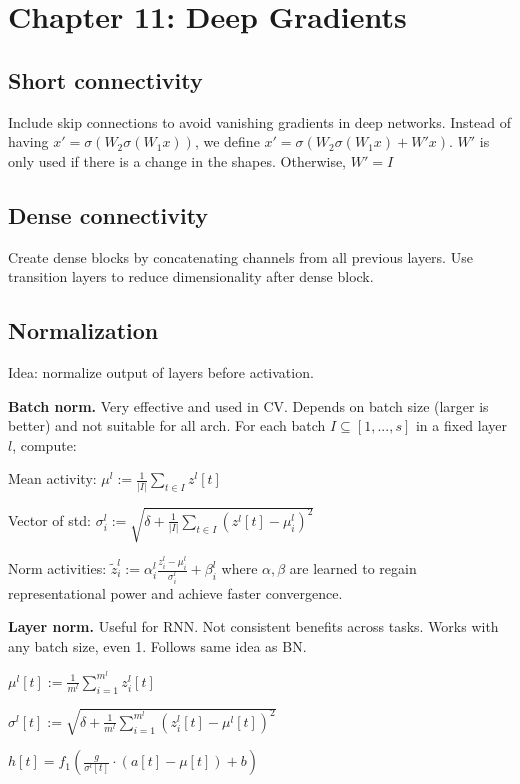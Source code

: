 \section*{Chapter 11: Deep Gradients}
\subsection*{Short connectivity}
Include skip connections to avoid vanishing gradients in deep networks. Instead of having $x'=\sigma(W_2\sigma(W_1x))$, we define $x'=\sigma(W_2\sigma(W_1x) + W'x)$. $W'$ is only used if there is a change in the shapes. Otherwise, $W'=I$

\subsection*{Dense connectivity}
Create dense blocks by concatenating channels from all previous layers. Use transition layers to reduce dimensionality after dense block.

\subsection*{Normalization}
Idea: normalize output of layers before activation.

\textbf{Batch norm.} Very effective and used in CV. Depends on batch size (larger is better) and not suitable for all arch. For each batch $I \subseteq [1,..., s]$ in a fixed layer $l$, compute:

Mean activity: $\mu^l:=\frac{1}{|I|}\sum_{t\in I}z^l[t]$

Vector of std: $\sigma_i^l := \sqrt{\delta + \frac{1}{|I|}\sum_{t\in I}(z^l[t]-\mu_i^l)^2}$

Norm activities: $\tilde{z}_i^l := \alpha_i^l \frac{z_i^l - \mu_i^l}{\sigma_i^l} + \beta_i^l$ where $\alpha, \beta$ are learned to regain representational power and achieve faster convergence.

\textbf{Layer norm.} Useful for RNN. Not consistent benefits across tasks. Works with any batch size, even 1. Follows same idea as BN.

$\mu^l[t] := \frac{1}{m^l}\sum_{i=1}^{m^l}z_i^l[t]$

$\sigma^l[t] := \sqrt{\delta + \frac{1}{m^l}\sum_{i=1}^{m^l}(z_i^l[t]-\mu^l[t])^2}$

$h[t] = f_1(\frac{g}{\sigma^l[t]} \cdot (a[t] - \mu[t]) + b)$
